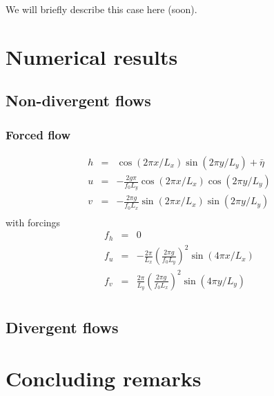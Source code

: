 \documentclass[10pt,a4paper]{article}
\begin{document}
We will briefly describe this case here (soon).

\section{Numerical results}

\subsection{Non-divergent flows}

\subsubsection*{Forced flow}
\begin{eqnarray}
h&=&\cos(2 \pi x/L_x)\sin(2\pi y /L_y) + \bar{\eta}\\
u&=&-\frac{2 g \pi}{f_0 L_y} \cos(2\pi x/L_x) \cos(2\pi y /L_y)\\
v&=& -\frac{2 \pi g}{f_0 L_x} \sin(2\pi x/L_x) \sin(2\pi y/L_y)\\
\end{eqnarray}
with forcings
\begin{eqnarray}
f_h&=&0\\
f_u&=&-\frac{2\pi}{L_x}\left(\frac{2 \pi g}{f_0 L_y}\right)^2 \sin(4\pi x/L_x)\\
f_v&=& \frac{2\pi}{L_y}\left(\frac{2 \pi g}{f_0 L_x}\right)^2 \sin(4\pi y/L_y)\\
\end{eqnarray}

\subsection{Divergent flows}


\section{Concluding remarks}





\appendix
\end{document}
